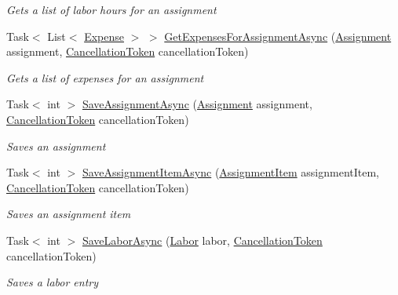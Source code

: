 \begin{DoxyCompactItemize}
\begin{DoxyCompactList}\small\item\em Gets a list of labor hours for an assignment \end{DoxyCompactList}\item 
Task$<$ List$<$ \hyperlink{class_field_service_1_1_data_1_1_expense}{Expense} $>$ $>$ \hyperlink{class_field_service_1_1_tests_1_1_mocks_1_1_mock_assignment_service_a7f7a053533c01ec744134a0f2f7cd09c}{Get\+Expenses\+For\+Assignment\+Async} (\hyperlink{class_field_service_1_1_data_1_1_assignment}{Assignment} assignment, \hyperlink{_view_models_2_assignment_view_model_8cs_aba80ec766846c61f55644fd23860cb18}{Cancellation\+Token} cancellation\+Token)
\begin{DoxyCompactList}\small\item\em Gets a list of expenses for an assignment \end{DoxyCompactList}\item 
Task$<$ int $>$ \hyperlink{class_field_service_1_1_tests_1_1_mocks_1_1_mock_assignment_service_a5e500f280c2a04a6e33392f1df3351ba}{Save\+Assignment\+Async} (\hyperlink{class_field_service_1_1_data_1_1_assignment}{Assignment} assignment, \hyperlink{_view_models_2_assignment_view_model_8cs_aba80ec766846c61f55644fd23860cb18}{Cancellation\+Token} cancellation\+Token)
\begin{DoxyCompactList}\small\item\em Saves an assignment \end{DoxyCompactList}\item 
Task$<$ int $>$ \hyperlink{class_field_service_1_1_tests_1_1_mocks_1_1_mock_assignment_service_a4410ae5454950312b9ce1d3025928c2b}{Save\+Assignment\+Item\+Async} (\hyperlink{class_field_service_1_1_data_1_1_assignment_item}{Assignment\+Item} assignment\+Item, \hyperlink{_view_models_2_assignment_view_model_8cs_aba80ec766846c61f55644fd23860cb18}{Cancellation\+Token} cancellation\+Token)
\begin{DoxyCompactList}\small\item\em Saves an assignment item \end{DoxyCompactList}\item 
Task$<$ int $>$ \hyperlink{class_field_service_1_1_tests_1_1_mocks_1_1_mock_assignment_service_a2ae5c0f0569d8055e918e95070b78bd5}{Save\+Labor\+Async} (\hyperlink{class_field_service_1_1_data_1_1_labor}{Labor} labor, \hyperlink{_view_models_2_assignment_view_model_8cs_aba80ec766846c61f55644fd23860cb18}{Cancellation\+Token} cancellation\+Token)
\begin{DoxyCompactList}\small\item\em Saves a labor entry \end{DoxyCompactList}\item 

\end{DoxyCompactItemize}
